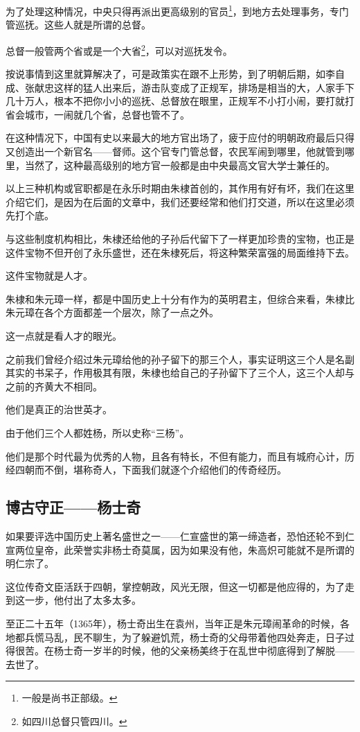 \begin{multicols}{\theparacolNo}
为了处理这种情况，中央只得再派出更高级别的官员\footnote{一般是尚书正部级。}，到地方去处理事务，专门管巡抚。这些人就是所谓的总督。

总督一般管两个省或是一个大省\footnote{如四川总督只管四川。}，可以对巡抚发令。

按说事情到这里就算解决了，可是政策实在跟不上形势，到了明朝后期，如李自成、张献忠这样的猛人出来后，游击队变成了正规军，排场是相当的大，人家手下几十万人，根本不把你小小的巡抚、总督放在眼里，正规军不小打小闹，要打就打省会城市，一闹就几个省，总督也管不了。

在这种情况下，中国有史以来最大的地方官出场了，疲于应付的明朝政府最后只得又创造出一个新官名——督师。这个官专门管总督，农民军闹到哪里，他就管到哪里，当然了，这种最高级别的地方官一般都是由中央最高文官大学士兼任的。

以上三种机构或官职都是在永乐时期由朱棣首创的，其作用有好有坏，我们在这里介绍它们，是因为在后面的文章中，我们还要经常和他们打交道，所以在这里必须先打个底。

与这些制度机构相比，朱棣还给他的子孙后代留下了一样更加珍贵的宝物，也正是这件宝物不但开创了永乐盛世，还在朱棣死后，将这种繁荣富强的局面维持下去。

这件宝物就是人才。

朱棣和朱元璋一样，都是中国历史上十分有作为的英明君主，但综合来看，朱棣比朱元璋在各个方面都差一个层次，除了一点之外。

这一点就是看人才的眼光。

之前我们曾经介绍过朱元璋给他的孙子留下的那三个人，事实证明这三个人是名副其实的书呆子，作用极其有限，朱棣也给自己的子孙留下了三个人，这三个人却与之前的齐黄大不相同。

他们是真正的治世英才。

由于他们三个人都姓杨，所以史称“三杨”。

他们是那个时代最为优秀的人物，且各有特长，不但有能力，而且有城府心计，历经四朝而不倒，堪称奇人，下面我们就逐个介绍他们的传奇经历。

\subsection{博古守正——杨士奇}
如果要评选中国历史上著名盛世之一——仁宣盛世的第一缔造者，恐怕还轮不到仁宣两位皇帝，此荣誉实非杨士奇莫属，因为如果没有他，朱高炽可能就不是所谓的明仁宗了。

这位传奇文臣活跃于四朝，掌控朝政，风光无限，但这一切都是他应得的，为了走到这一步，他付出了太多太多。

至正二十五年（1365年），杨士奇出生在袁州，当年正是朱元璋闹革命的时候，各地都兵慌马乱，民不聊生，为了躲避饥荒，杨士奇的父母带着他四处奔走，日子过得很苦。在杨士奇一岁半的时候，他的父亲杨美终于在乱世中彻底得到了解脱——去世了。


\end{multicols}
